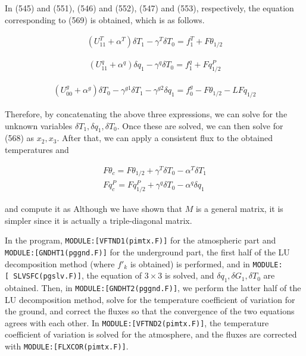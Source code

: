 In (545) and (551), (546) and (552), (547) and (553), respectively, the
equation corresponding to (569) is obtained, which is as follows.

\begin{eqnarray}
  ( U^{T}_{11} +  \alpha^{T}  ) \delta T_1 - \gamma^{T} \delta T_0
      = f^{T}_1 + F\theta_{1/2}
\end{eqnarray}

\begin{eqnarray}
  ( U^{q}_{11} +  \alpha^{q}  ) \delta q_1 - \gamma^{q} \delta T_0
      = f^{q}_1 + Fq^P_{1/2}
\end{eqnarray}

\begin{eqnarray}
  ( U^{g}_{00} +  \alpha^{g}  ) \delta T_0 - \gamma^{g1} \delta T_1
                                           - \gamma^{g2} \delta q_1
      = f^{g}_0 - F\theta_{1/2} - L Fq_{1/2}
\end{eqnarray}

Therefore, by concatenating the above three expressions, we can solve
for the unknown variables \(\delta T_1, \delta q_1, \delta T_0\). Once
these are solved, we can then solve for (568) as \(x_2,x_3\). After
that, we can apply a consistent flux to the obtained temperatures and

\begin{eqnarray}
  F\theta_c  =  F\theta_{1/2}
                   + \gamma^{T} \delta T_0 -\alpha^{T} \delta T_1 \\
  Fq^P_c  =  Fq^P_{1/2}
                   + \gamma^{q} \delta T_0 -\alpha^{q} \delta q_1
\end{eqnarray}

and compute it as Although we have shown that \(M\) is a general matrix,
it is simpler since it is actually a triple-diagonal matrix.

In the program, \texttt{MODULE:{[}VFTND1(pimtx.F){]}} for the
atmospheric part and \texttt{MODULE:{[}GNDHT1(pggnd.F){]}} for the
underground part, the first half of the LU decomposition method (where
\(f'_k\) is obtained) is performed, and in
\texttt{MODULE:{[}\ SLVSFC(pgslv.F){]}}, the equation of \(3\times 3\)
is solved, and \(\delta q_1, \delta G_1, \delta T_0\) are obtained.
Then, in \texttt{MODULE:{[}GNDHT2(pggnd.F){]}}, we perform the latter
half of the LU decomposition method, solve for the temperature
coefficient of variation for the ground, and correct the fluxes so that
the convergence of the two equations agrees with each other. In
\texttt{MODULE:{[}VFTND2(pimtx.F){]}}, the temperature coefficient of
variation is solved for the atmosphere, and the fluxes are corrected
with \texttt{MODULE:{[}FLXCOR(pimtx.F){]}}.

